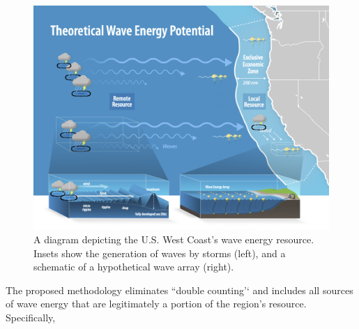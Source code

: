 \begin{figure}[ht]
\centering
\includegraphics[width=\linewidth]{../fig/NREL-water-NatureEnergyGraphic-Levi-FY21-jfrenzl-v5.png}
\caption{A diagram depicting the U.S. West Coast's wave energy resource. Insets show the generation of waves by storms (left), and a schematic of a hypothetical wave array (right).}
\label{fig:diagram:west-eez}
\end{figure}

The proposed methodology eliminates ``double counting'‘ and includes all sources of wave energy that are legitimately a portion of the region's resource. Specifically,

